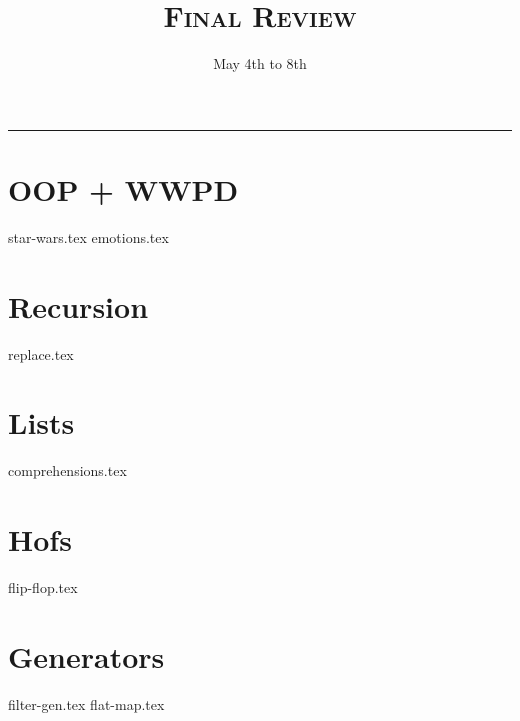 \documentclass{exam}
\title{\textsc{Final Review}}
\date{May 4th to 8th}
\begin{document}
\maketitle
\rule{\textwidth}{0.15em}
\fontsize{12}{15}\selectfont


\begin{questions}

\section{OOP + WWPD}
{star-wars.tex}
\newpage
{emotions.tex}
\newpage
\section{Recursion}
{replace.tex}
\newpage
\section{Lists}
{comprehensions.tex}
\newpage
\section{Hofs}
{flip-flop.tex}

\newpage
\section{Generators}
{filter-gen.tex}
{flat-map.tex}



\end{questions}
\end{document}
